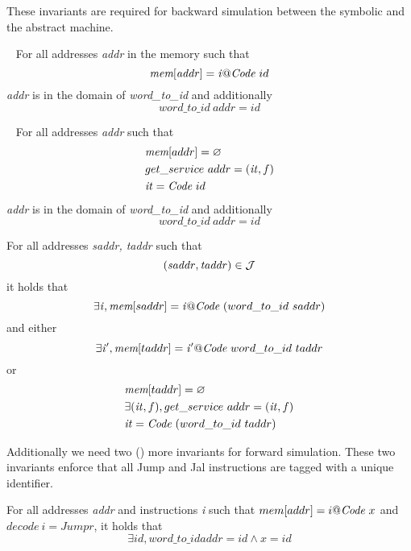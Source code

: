 These invariants are required for backward simulation between
the symbolic and the abstract machine.

\begin{definition}\label{instructions_tagged}
  ~ For all addresses \textit{addr} in the memory such that
  $$\textit{mem}[\mathit{addr}] = \mathit{i}@\textit{Code}~id$$ \textit{addr}
  is in the domain of \emph{word\_to\_id} and additionally
  $$word\_to\_id ~\mathit{addr} = \mathit{id}$$
\end{definition}

\begin{definition}\label{entry_tagged}
  ~ For all addresses \textit{addr} such that
  \begin{align*}
  & \textit{mem}[addr] = \varnothing\\
  & get\_service~addr = (\mathit{it},f)\\
  & \mathit{it} = \textit{Code}~id
  \end{align*}
  \textit{addr} is in the domain of \emph{word\_to\_id} and additionally
  $$word\_to\_id ~\mathit{addr} = \mathit{id}$$
\end{definition}

\begin{definition}\label{valid_jmp_tagged}
  For all addresses \textit{saddr, taddr} such that
  $$(\mathit{saddr},\mathit{taddr}) \in \mathcal{J}$$ it holds that
  $$\exists \mathit{i}, \textit{mem}[saddr] = \mathit{i}@\textit{Code}~(word\_to\_id~saddr) $$
  and either $$\exists \mathit{i'}, \textit{mem}[taddr]
  =\mathit{i'}@\textit{Code}~word\_to\_id~taddr$$ or
  \begin{align*}
  & \textit{mem}[taddr] = \varnothing\\
  & \exists (\mathit{it},f), get\_service~addr = (\mathit{it},f)\\
  & \mathit{it} = \textit{Code}~(word\_to\_id~taddr)
  \end{align*}
\end{definition}

Additionally we need two () more invariants for forward
simulation. These two invariants enforce that all Jump and Jal instructions
are tagged with a unique identifier.

\begin{definition}\label{jumps_tagged}
  For all addresses \textit{addr} and instructions \textit{i} such
  that $mem[addr]=i@\textit{Code}~x$ and $decode~i = Jump r$, it holds that
  $$\exists id, word\_to\_id addr = id \land x = id$$
\end{definition}

